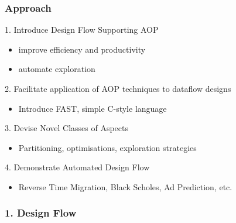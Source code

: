 \begin{frame}
  \frametitle{Approach}
  \begin{beamerboxesrounded}{1. Introduce Design Flow Supporting AOP}
    \begin{itemize}
      \item improve efficiency and productivity
      \item automate exploration
    \end{itemize}
  \end{beamerboxesrounded}
  \begin{beamerboxesrounded}{2. Facilitate application of AOP
      techniques to dataflow designs}
    \begin{itemize}
    \item Introduce FAST, simple C-style language
    \end{itemize}
  \end{beamerboxesrounded}

  \begin{beamerboxesrounded}{3. Devise Novel Classes of Aspects}
    \begin{itemize}
    \item Partitioning, optimisations, exploration strategies
    \end{itemize}
  \end{beamerboxesrounded}

  \begin{beamerboxesrounded}{4. Demonstrate Automated Design Flow}
    \begin{itemize}
    \item Reverse Time Migration, Black Scholes, Ad Prediction, etc.
    \end{itemize}
  \end{beamerboxesrounded}
\end{frame}

\begin{frame}
  \frametitle{1. Design Flow}
  \vspace{-0.3cm}
  \begin{figure}
    \centering
    \def\svgwidth{0.88\textwidth}
    
  \end{figure}
\end{frame}